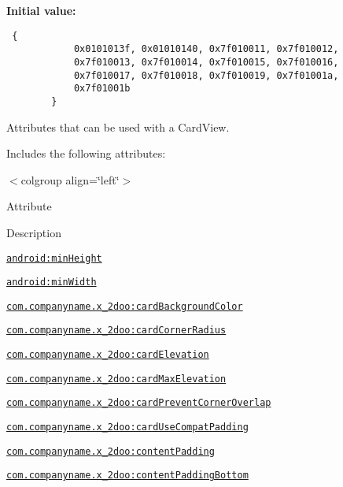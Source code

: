 \textbf{Initial value:}

\begin{Code}\begin{verbatim} {
            0x0101013f, 0x01010140, 0x7f010011, 0x7f010012,
            0x7f010013, 0x7f010014, 0x7f010015, 0x7f010016,
            0x7f010017, 0x7f010018, 0x7f010019, 0x7f01001a,
            0x7f01001b
        }
\end{verbatim}
\end{Code}
Attributes that can be used with a CardView. 

Includes the following attributes: \begin{TabularC}{0}
\hline
\end{TabularC}
$<$colgroup align=\char`\"{}left\char`\"{}$>$ 

Attribute

Description 

{\tt \hyperlink{classandroid_1_1support_1_1v4_1_1_r_1_1styleable_577b2e52dc2fbfc09f905ea26e5f682e}{android:minHeight}}

{\tt \hyperlink{classandroid_1_1support_1_1v4_1_1_r_1_1styleable_3cd23d6fa94330913ba4cb084d788c59}{android:minWidth}}

{\tt \hyperlink{classandroid_1_1support_1_1v4_1_1_r_1_1styleable_94fc58f0d182831ec612958ddf3d8b9f}{com.companyname.x\_\-2doo:cardBackgroundColor}}

{\tt \hyperlink{classandroid_1_1support_1_1v4_1_1_r_1_1styleable_aac33a30bef514283621969faf8acce1}{com.companyname.x\_\-2doo:cardCornerRadius}}

{\tt \hyperlink{classandroid_1_1support_1_1v4_1_1_r_1_1styleable_c0ff8cacb9a2d63dd25ab692b44a2804}{com.companyname.x\_\-2doo:cardElevation}}

{\tt \hyperlink{classandroid_1_1support_1_1v4_1_1_r_1_1styleable_7e06403a899e01eae19c14aae1ee38cc}{com.companyname.x\_\-2doo:cardMaxElevation}}

{\tt \hyperlink{classandroid_1_1support_1_1v4_1_1_r_1_1styleable_7759a07eb90cf3b5a562d36a7f68e79f}{com.companyname.x\_\-2doo:cardPreventCornerOverlap}}

{\tt \hyperlink{classandroid_1_1support_1_1v4_1_1_r_1_1styleable_5fa6aadc3bb0cfa41fd1cf7e91655290}{com.companyname.x\_\-2doo:cardUseCompatPadding}}

{\tt \hyperlink{classandroid_1_1support_1_1v4_1_1_r_1_1styleable_5c42c3e1c3a5864233a443fd167fc4e3}{com.companyname.x\_\-2doo:contentPadding}}

{\tt \hyperlink{classandroid_1_1support_1_1v4_1_1_r_1_1styleable_a790a1e2e5bcbfb64d641cb1be13698d}{com.companyname.x\_\-2doo:contentPaddingBottom}}

